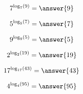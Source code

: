 \documentclass{ximera}
\author{Lee Wayand}
\begin{document}
\begin{example}













\[
7^{\log_7(9)} = \answer{9}
\]




\[
5^{\log_5(7)} = \answer{7}
\]




\[
9^{\log_9(5)} = \answer{5}
\]








\[
2^{\log_2(19)} = \answer{19}
\]




\[
17^{\log_{17}(43)} = \answer{43}
\]




\[
4^{\log_4(95)} = \answer{95}
\]























\end{example}
\end{document}
